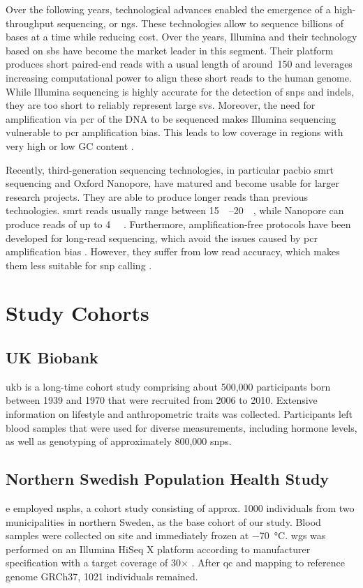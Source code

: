 \documentclass[draft]{scrbook}
\begin{document}
Over the following years, technological advances enabled the emergence of a high-throughput sequencing, or \gls{ngs}.
These technologies allow to sequence billions of bases at a time while reducing cost.
Over the years, Illumina and their technology based on \gls{sbs} have become the market leader in this segment.
Their platform produces short paired-end reads with a usual length of around \qty{150}{\base} and leverages increasing computational power to align these short reads to the human genome.
While Illumina sequencing is highly accurate for the detection of \glspl{snp} and \glspl{indel}, they are too short to reliably represent large \glspl{sv}.
Moreover, the need for amplification via \gls{pcr} of the DNA to be sequenced makes Illumina sequencing vulnerable to \gls{pcr} amplification bias.
This leads to low coverage in regions with very high or low GC content \cite{Aird2011}.

Recently, third-generation sequencing technologies, in particular \gls{pacbio} \gls{smrt} sequencing and Oxford Nanopore, have matured and become usable for larger research projects.
They are able to produce longer reads than previous technologies.
\Gls{smrt} reads usually range between \qtyrange{15}{20}{\kilo\base}, while Nanopore can produce reads of up to \qty{4}{\mega\base} \cite{Wenger2019,Payne2019}.
Furthermore, amplification-free protocols have been developed for long-read sequencing, which avoid the issues caused by \gls{pcr} amplification bias \cite{Hoijer2018}.
However, they suffer from low read accuracy, which makes them less suitable for \gls{snp} calling \cite{Rang2018}.

\section{Study Cohorts}
\subsection{UK Biobank}
\Gls{ukb} is a long-time cohort study comprising about 500,000 participants born between 1939 and 1970 that were recruited from 2006 to 2010.
Extensive information on lifestyle and anthropometric traits was collected.
Participants left blood samples that were used for diverse measurements, including hormone levels, as well as genotyping of approximately 800,000 \glspl{snp}.

\subsection{Northern Swedish Population Health Study}
e employed \gls{nsphs}, a cohort study consisting of approx. 1000 individuals from two municipalities in northern Sweden, as the base cohort of our study.
Blood samples were collected on site and immediately frozen at \qty{-70}{\celsius}.
\Gls{wgs} was performed on an Illumina HiSeq X platform according to manufacturer specification with a target coverage of 30$\times$ \cite{Ameur2017}.
After \gls{qc} and mapping to reference genome GRCh37, 1021 individuals remained.
\end{document}
